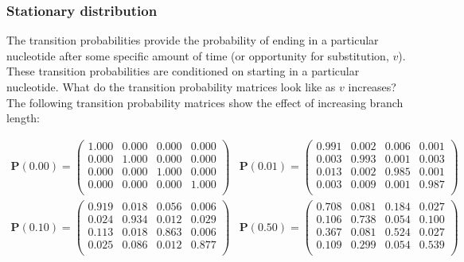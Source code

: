 \documentclass{svmult}
\begin{document}
\subsubsection{Stationary distribution} The transition probabilities provide the probability of
ending in a particular nucleotide after some specific amount of time (or opportunity for
substitution, $v$). These transition probabilities are conditioned on starting in a particular
nucleotide. What do the transition probability matrices look like as $v$ increases? The following
transition probability matrices show the effect of increasing branch length:

$$
\begin{array}{cc}
{{\mathbf P}(0.00) = \left( \begin{array}{rrrr}
1.000 & 0.000 & 0.000 & 0.000 \\
0.000 & 1.000 & 0.000 & 0.000 \\
0.000 & 0.000 & 1.000 & 0.000 \\
0.000 & 0.000 & 0.000 & 1.000 \\
\end{array} \right)}
 &
{{\mathbf P}(0.01) = \left( \begin{array}{rrrr}
0.991 & 0.002 & 0.006 & 0.001 \\
0.003 & 0.993 & 0.001 & 0.003 \\
0.013 & 0.002 & 0.985 & 0.001 \\
0.003 & 0.009 & 0.001 & 0.987 \\
\end{array} \right)}
\end{array}
$$
$$
\begin{array}{cc}
{{\mathbf P}(0.10) = \left( \begin{array}{rrrr}
0.919 & 0.018 & 0.056 & 0.006 \\
0.024 & 0.934 & 0.012 & 0.029 \\
0.113 & 0.018 & 0.863 & 0.006 \\
0.025 & 0.086 & 0.012 & 0.877 \\
\end{array} \right)}
 &
{{\mathbf P}(0.50) = \left( \begin{array}{rrrr}
0.708 & 0.081 & 0.184 & 0.027 \\
0.106 & 0.738 & 0.054 & 0.100 \\
0.367 & 0.081 & 0.524 & 0.027 \\
0.109 & 0.299 & 0.054 & 0.539 \\
\end{array} \right)}
\end{array}
$$
\end{document}
